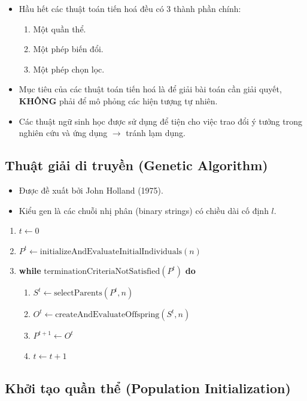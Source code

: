 \documentclass{book}
\begin{document}
\begin{itemize}
    \item Hầu hết các thuật toán tiến hoá đều có 3 thành phần chính:
    \begin{enumerate}
        \item Một quần thể.
        \item Một phép biến đổi.
        \item Một phép chọn lọc.
    \end{enumerate}
    \item Mục tiêu của các thuật toán tiến hoá là để giải bài toán cần giải quyết, \textbf{KHÔNG} phải để mô phỏng các hiện tượng tự nhiên.
    \item Các thuật ngữ sinh học được sử dụng để tiện cho việc trao đổi ý tưởng trong nghiên cứu và ứng dụng $\rightarrow$ tránh lạm dụng.
\end{itemize}

\subsection{Thuật giải di truyền (Genetic Algorithm)}

\begin{itemize}
    \item Được đề xuất bởi John Holland (1975).
    \item Kiểu gen là các chuỗi nhị phân (binary strings) có chiều dài cố định $l$.
\end{itemize}

\begin{enumerate}
    \item $t \leftarrow 0$
    \item $P^t \leftarrow \text{initializeAndEvaluateInitialIndividuals}( n )$
    \item \textbf{while} $\text{terminationCriteriaNotSatisfied}( P^t )$ \textbf{do}
    \begin{enumerate}
        \item $S^t \leftarrow \text{selectParents}( P^t, n )$
        \item $O^t \leftarrow \text{createAndEvaluateOffspring}( S^t, n )$
        \item $P^{t+1} \leftarrow O^t$
        \item $t \leftarrow t + 1$
    \end{enumerate}
\end{enumerate}

\subsection{Khởi tạo quần thể
(Population Initialization)}
\end{document}
